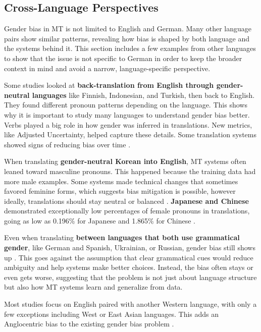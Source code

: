 \subsection{Cross-Language Perspectives}
Gender bias in MT is not limited to English and German. Many other language pairs show similar patterns, revealing how bias is shaped by both language and the systems behind it. This section includes a few examples from other languages to show that the issue is not specific to German in order to keep the broader context in mind and avoid a narrow, language-specific perspective.

Some studies looked at \textbf{back-translation from English through gender-neutral languages} like Finnish, Indonesian, and Turkish, then back to English. They found different pronoun patterns depending on the language. This shows why it is important to study many languages to understand gender bias better. Verbs played a big role in how gender was inferred in translations. New metrics, like Adjusted Uncertainty, helped capture these details. Some translation systems showed signs of reducing bias over time \citep{barclayInvestigatingMarkersDrivers2024a}.

When translating \textbf{gender-neutral Korean into English}, MT systems often leaned toward masculine pronouns. This happened because the training data had more male examples. Some systems made technical changes that sometimes favored feminine forms, which suggests bias mitigation is possible, however ideally, translations should stay neutral or balanced \citep{choMeasuringGenderBias2019}. \textbf{Japanese and Chinese} demonstrated exceptionally low percentages of female pronouns in translations, going as low as 0.196\% for Japanese and 1.865\% for Chinese \citep{pratesAssessingGenderBias2019}.

Even when translating \textbf{between languages that both use grammatical gender}, like German and Spanish, Ukrainian, or Russian, gender bias still shows up \citep{kapplAreAllSpanish2025}. This goes against the assumption that clear grammatical cues would reduce ambiguity and help systems make better choices. Instead, the bias often stays or even gets worse, suggesting that the problem is not just about language structure but also how MT systems learn and generalize from data.

Most studies focus on English paired with another Western language, with only a few exceptions including West or East Asian languages. This adds an Anglocentric bias to the existing gender bias problem \citep{savoldiDecadeGenderBias2025}.


